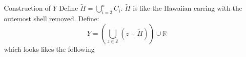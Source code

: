 \documentclass[14pt]{beamer}
\begin{document}
\begin{frame}{Construction of $Y$}
    Define \textcolor{colororange}{$\tilde H=\bigcup_{i=2}^n C_i$}. $\tilde H$ is like the Hawaiian earring with the outemost shell removed. Define: \textcolor{colororange}{$$Y=\left(\bigcup_{z\in\mathbb Z}(z+\tilde H)\right)\cup\mathbb R$$}\pause which looks likes the following
    \begin{center}
        



\begin{tikzpicture}[x=0.6pt,y=0.6pt,yscale=-1,xscale=1]


\end{tikzpicture}
\end{center}
\end{frame}
\end{document}
